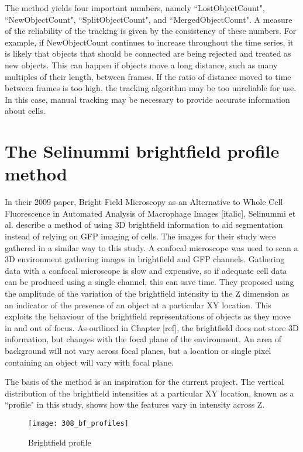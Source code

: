 The method yields four important numbers, namely ``LostObjectCount", ``NewObjectCount", ``SplitObjectCount", and ``MergedObjectCount". A measure of the reliability of the tracking is given by the consistency of these numbers. For example, if NewObjectCount continues to increase throughout the time series, it is likely that objects that should be connected are being rejected and treated as new objects. This can happen if objects move a long distance, such as many multiples of their length, between frames. If the ratio of distance moved to time between frames is too high, the tracking algorithm may be too unreliable for use. In this case, manual tracking may be necessary to provide accurate information about cells.

\section{The Selinummi brightfield profile method}

In their 2009 paper, Bright Field Microscopy as an Alternative to Whole Cell Fluorescence in Automated Analysis of Macrophage Images [italic], Selinummi et al. describe a method of using 3D brightfield information to aid segmentation instead of relying on GFP imaging of cells. The images for their study were gathered in a similar way to this study. A confocal microscope was used to scan a 3D environment gathering images in brightfield and GFP channels. Gathering data with a confocal microscope is slow and expensive, so if adequate cell data can be produced using a single channel, this can save time. They proposed using the amplitude of the variation of the brightfield intensity in the Z dimension as an indicator of the presence of an object at a particular XY location. This exploits the behaviour of the brightfield representations of objects as they move in and out of focus. As outlined in Chapter [ref], the brightfield does not store 3D information, but changes with the focal plane of the environment. An area of background will not vary across focal planes, but a location or single pixel containing an object will vary with focal plane.

The basis of the method is an inspiration for the current project. The vertical distribution of the brightfield intensities at a particular XY location, known as a ``profile" in this study, shows how the features vary in intensity across Z.

\begin{figure}[p]
 \centering
 \texttt{[image: 308\_bf\_profiles]}
 \caption{
 	Brightfield profile
 }
 \label{fig:brightfieldprofile}
\end{figure}

